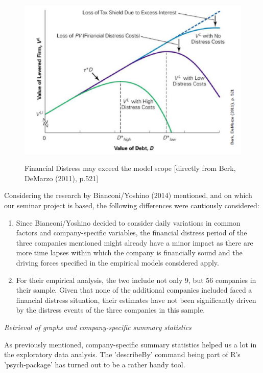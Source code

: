 \documentclass[a4paper]{article}
\begin{document}
\begin{figure}[ht]
\begin{center}
\includegraphics[scale=1]{cofi-berk-demarzo.pdf}\\
\label{}
\caption{Financial Distress may exceed the model scope [directly from Berk, DeMarzo (2011), p.521]}
\end{center}
\end{figure}

Considering the research by Bianconi/Yoshino (2014) mentioned, and on which our seminar project is based, the following differences were cautiously considered:

\begin{enumerate}
\item Since Bianconi/Yoshino decided to consider daily variations in common factors and company-specific variables, the financial distress period of the three companies mentioned might already have a minor impact as there are more time lapses within which the company is financially sound and the driving forces specified in the empirical models considered apply. 
\item For their empirical analysis, the two include not only 9, but 56 companies in their sample. Given that none of the additional companies included faced a financial distress situation, their estimates have not been significantly driven by the distress events of the three companies in this sample.
\end{enumerate}

\emph{Retrieval of graphs and company-specific summary statistics}

As previously mentioned, company-specific summary statistics helped us a lot in the exploratory data analysis. The 'describeBy' command being part of R's 'psych-package' has turned out to be a rather handy tool.
\end{document}

